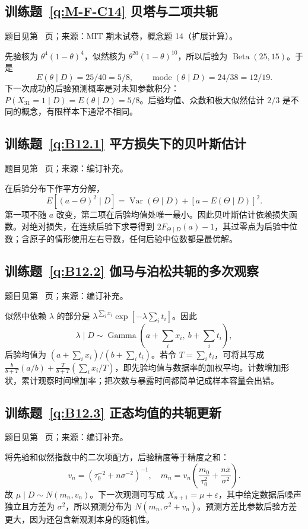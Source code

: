 \documentclass[UTF8,12pt,a4paper,fontset=fandol]{ctexbook}
\begin{document}
\subsection*{训练题~\ref{q:M-F-C14} 贝塔与二项共轭}\label{a:M-F-C14}{\small 题目见第~\pageref{q:M-F-C14} 页；来源：MIT 期末试卷，概念题 14（扩展计算）。}
\begin{solve}先验核为 $\theta^4(1-\theta)^4$，似然核为 $\theta^{20}(1-\theta)^{10}$，所以后验为 $\operatorname{Beta}(25,15)$。于是\[E(\theta\mid D)=25/40=5/8,\qquad\operatorname{mode}(\theta\mid D)=24/38=12/19.\]下一次成功的后验预测概率是对未知参数积分：$P(X_{31}=1\mid D)=E(\theta\mid D)=5/8$。后验均值、众数和极大似然估计 $2/3$ 是不同的概念，有限样本下通常不相同。\end{solve}

\subsection*{训练题~\ref{q:B12.1} 平方损失下的贝叶斯估计}\label{a:B12.1}{\small 题目见第~\pageref{q:B12.1} 页；来源：编订补充。}
\begin{solve}在后验分布下作平方分解，\[E[(a-\Theta)^2\mid D]=\operatorname{Var}(\Theta\mid D)+[a-E(\Theta\mid D)]^2.\]第一项不随 $a$ 改变，第二项在后验均值处唯一最小。因此贝叶斯估计依赖损失函数。对绝对损失，在连续后验下求导得到 $2F_{\Theta\mid D}(a)-1$，其过零点为后验中位数；含原子的情形使用左右导数，任何后验中位数都是最优解。\end{solve}

\subsection*{训练题~\ref{q:B12.2} 伽马与泊松共轭的多次观察}\label{a:B12.2}{\small 题目见第~\pageref{q:B12.2} 页；来源：编订补充。}
\begin{solve}似然中依赖 $\lambda$ 的部分是 $\lambda^{\sum_i x_i}\exp[-\lambda\sum_i t_i]$。因此\[\lambda\mid D\sim\operatorname{Gamma}\left(a+\sum_i x_i,\ b+\sum_i t_i\right),\]后验均值为 $(a+\sum_i x_i)/(b+\sum_i t_i)$。若令 $T=\sum_i t_i$，可将其写成 $\frac{b}{b+T}(a/b)+\frac{T}{b+T}(\sum_i x_i/T)$，即先验均值与数据率的加权平均。计数增加形状，累计观察时间增加率；把次数与暴露时间都简单记成样本容量会出错。\end{solve}

\subsection*{训练题~\ref{q:B12.3} 正态均值的共轭更新}\label{a:B12.3}{\small 题目见第~\pageref{q:B12.3} 页；来源：编订补充。}
\begin{solve}将先验和似然指数中的二次项配方，后验精度等于精度之和：\[v_n=\left(\tau_0^{-2}+n\sigma^{-2}\right)^{-1},\quad m_n=v_n\left(\frac{m_0}{\tau_0^2}+\frac{n\overline x}{\sigma^2}\right).\]故 $\mu\mid D\sim N(m_n,v_n)$。下一次观测可写成 $X_{n+1}=\mu+\varepsilon$，其中给定数据后噪声独立且方差为 $\sigma^2$，所以预测分布为 $N(m_n,\sigma^2+v_n)$。预测方差比参数后验方差更大，因为还包含新观测本身的随机性。\end{solve}
\end{document}
